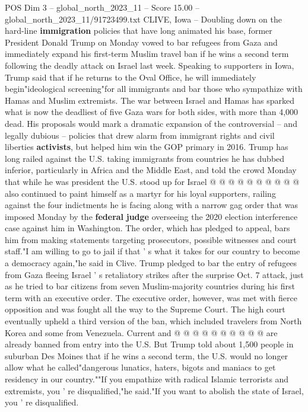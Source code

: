 \begin{textsample}{POS Dim 3 – global\_north\_2023\_11 – Score 15.00 – global\_north\_2023\_11/91723499.txt}  \label{ex:f3_pos_181}
CLIVE, Iowa -- Doubling down on the hard-line \textbf{immigration} policies that have long animated his base, former President Donald Trump on Monday vowed to bar refugees from Gaza and immediately expand his first-term Muslim travel ban if he wins a second term following the deadly attack on Israel last week.
Speaking to supporters in Iowa, Trump said that if he returns to the Oval Office, he will immediately begin"ideological screening"for all immigrants and bar those who sympathize with Hamas and Muslim extremists.
The war between Israel and Hamas has sparked what is now the deadliest of five Gaza wars for both sides, with more than 4,000 dead.
His proposals would mark a dramatic expansion of the controversial -- and legally dubious -- policies that drew alarm from immigrant rights and civil liberties \textbf{activists}, but helped him win the GOP primary in 2016.
Trump has long railed against the U.S. taking immigrants from countries he has dubbed inferior, particularly in Africa and the Middle East, and told the crowd Monday that while he was president the U.S. stood up for Israel @ @ @ @ @ @ @ @ @ @ also continued to paint himself as a martyr for his loyal supporters, railing against the four indictments he is facing along with a narrow gag order that was imposed Monday by the \textbf{federal} \textbf{judge} overseeing the 2020 election interference case against him in Washington.
The order, which has pledged to appeal, bars him from making statements targeting prosecutors, possible witnesses and court staff."I am willing to go to jail if that ' s what it takes for our country to become a democracy again,"he said in Clive.
Trump pledged to bar the entry of refugees from Gaza fleeing Israel ' s retaliatory strikes after the surprise Oct. 7 attack, just as he tried to bar citizens from seven Muslim-majority countries during his first term with an executive order.
The executive order, however, was met with fierce opposition and was fought all the way to the Supreme Court.
The high court eventually upheld a third version of the ban, which included travelers from North Korea and some from Venezuela.
Current and @ @ @ @ @ @ @ @ @ @ are already banned from entry into the U.S.
But Trump told about 1,500 people in suburban Des Moines that if he wins a second term, the U.S. would no longer allow what he called"dangerous lunatics, haters, bigots and maniacs to get residency in our country.""If you empathize with radical Islamic terrorists and extremists, you ' re disqualified,"he said."If you want to abolish the state of Israel, you ' re disqualified.

\end{textsample}
